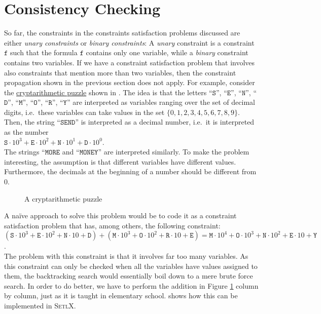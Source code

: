 \section{Consistency Checking}
So far, the constraints in the constraints satisfaction problems discussed are either \emph{\color{blue}unary constraints} 
or \emph{\color{blue}binary constraints}:  A \emph{\color{blue}unary} constraint is a constraint $\mathtt{f}$
such that the formula $\mathtt{f}$ contains only one variable, while a \emph{\color{blue}binary} constraint
contains two variables.  If we have a constraint satisfaction problem that involves also constraints that
mention more than two variables, then the constraint propagation shown in the previous section does not apply.
For example, consider the \href{https://en.wikipedia.org/wiki/Verbal_arithmetic}{cryptarithmetic puzzle} shown
in .  The idea is that the letters 
``$\mathtt{S}$'', ``$\mathtt{E}$'', ``$\mathtt{N}$'', ``$\mathtt{D}$'', ``$\mathtt{M}$'', ``$\mathtt{O}$'', ``$\mathtt{R}$'', ``$\mathtt{Y}$'' 
are interpreted as variables ranging over the set of decimal digits, i.e.~these variables can take values in
the set $\{0,1,2,3,4,5,6,7,8,9\}$.  Then, the string ``$\mathtt{SEND}$'' is interpreted as a decimal number,
i.e.~it is interpreted as the number
\\[0.2cm]
\hspace*{1.3cm}
$\mathtt{S} \cdot 10^3 + \mathtt{E} \cdot 10^2 + \mathtt{N} \cdot 10^1 + \mathtt{D} \cdot 10^0$.
\\[0.2cm]
The strings ``$\mathtt{MORE}$ and ``$\mathtt{MONEY}$'' are interpreted similarly. To make the problem
interesting, the assumption is that different variables have different values.  Furthermore, the
decimals at the beginning of a number should be different from $0$.


\begin{figure}[!ht]
\centering
{}

\caption{A cryptarithmetic puzzle}
\label{fig:send-more-money.pdf}
\end{figure}


\noindent
A na\"ive approach to solve this problem would be to code it as a constraint satisfaction problem that has,
among others,  the
following constraint:
\\[0.2cm]
\hspace*{1.3cm}
$   (\mathtt{S} \cdot 10^3 + \mathtt{E} \cdot 10^2 + \mathtt{N} \cdot 10 + \mathtt{D}) 
  + (\mathtt{M} \cdot 10^3 + \mathtt{O} \cdot 10^2 + \mathtt{R} \cdot 10 + \mathtt{E})
  = \mathtt{M} \cdot 10^4 + \mathtt{O} \cdot 10^3 + \mathtt{N} \cdot 10^2 + \mathtt{E} \cdot 10 + \mathtt{Y}
$.
\\[0.2cm]
 The problem with this constraint is that it involves far too many variables.  As this constraint can only be
 checked when all the variables have values assigned to them, the backtracking search would essentially
 boil down to a mere brute force search.  In order to do better, we have to perform the addition in Figure
 \ref{fig:send-more-money.pdf} column by column, just as it is taught in elementary school.
  shows how this can be implemented in \textsc{SetlX}.

